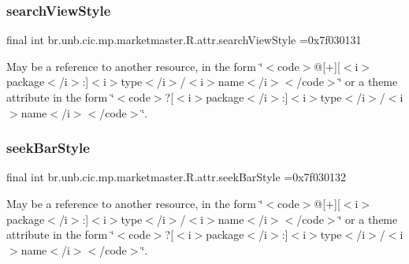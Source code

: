 \subsubsection{\texorpdfstring{search\+View\+Style}{searchViewStyle}}
{\footnotesize\ttfamily final int br.\+unb.\+cic.\+mp.\+marketmaster.\+R.\+attr.\+search\+View\+Style =0x7f030131\hspace{0.3cm}{\ttfamily [static]}}

May be a reference to another resource, in the form \char`\"{}$<$code$>$@\mbox{[}+\mbox{]}\mbox{[}$<$i$>$package$<$/i$>$\+:\mbox{]}$<$i$>$type$<$/i$>$/$<$i$>$name$<$/i$>$$<$/code$>$\char`\"{} or a theme attribute in the form \char`\"{}$<$code$>$?\mbox{[}$<$i$>$package$<$/i$>$\+:\mbox{]}$<$i$>$type$<$/i$>$/$<$i$>$name$<$/i$>$$<$/code$>$\char`\"{}. \mbox{\label{classbr_1_1unb_1_1cic_1_1mp_1_1marketmaster_1_1R_1_1attr_a90eca81d327d1a7d78da7ac71ad4be6e}} 
\subsubsection{\texorpdfstring{seek\+Bar\+Style}{seekBarStyle}}
{\footnotesize\ttfamily final int br.\+unb.\+cic.\+mp.\+marketmaster.\+R.\+attr.\+seek\+Bar\+Style =0x7f030132\hspace{0.3cm}{\ttfamily [static]}}

May be a reference to another resource, in the form \char`\"{}$<$code$>$@\mbox{[}+\mbox{]}\mbox{[}$<$i$>$package$<$/i$>$\+:\mbox{]}$<$i$>$type$<$/i$>$/$<$i$>$name$<$/i$>$$<$/code$>$\char`\"{} or a theme attribute in the form \char`\"{}$<$code$>$?\mbox{[}$<$i$>$package$<$/i$>$\+:\mbox{]}$<$i$>$type$<$/i$>$/$<$i$>$name$<$/i$>$$<$/code$>$\char`\"{}. \mbox{\label{classbr_1_1unb_1_1cic_1_1mp_1_1marketmaster_1_1R_1_1attr_ae64f06338522e70a301ef33bbcd7e6d2}} 
